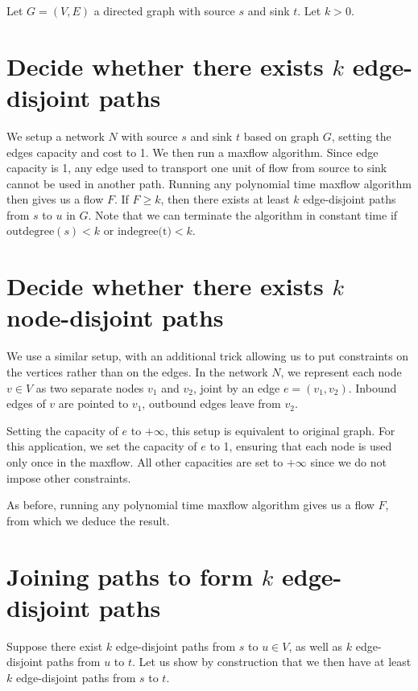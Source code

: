 \providecommand{\ra}[0]{\ensuremath{\rightarrow}}

Let $G = (V, E)$ a directed graph with source $s$ and sink $t$. Let $k > 0$.

\section{Decide whether there exists $k$ \textbf{edge}-disjoint paths}
We setup a network $N$ with source $s$ and sink $t$ based on graph $G$, setting the edges capacity and cost to 1. We then run a maxflow algorithm. Since edge capacity is 1, any edge used to transport one unit of flow from source to sink cannot be used in another path. Running any polynomial time maxflow algorithm then gives us a flow $F$. If $F \geq k$, then there exists at least $k$ edge-disjoint paths from $s$ to $u$ in $G$. Note that we can terminate the algorithm in constant time if $\text{outdegree}(s) < k$ or $\text{indegree(t)} < k$.

\section{Decide whether there exists $k$ \textbf{node}-disjoint paths}
We use a similar setup, with an additional trick allowing us to put constraints on the vertices rather than on the edges. In the network $N$, we represent each node $v \in V$ as two separate nodes $v_1$ and $v_2$, joint by an edge $e = (v_1, v_2)$. Inbound edges of $v$ are pointed to $v_1$, outbound edges leave from $v_2$.

Setting the capacity of $e$ to $+\infty$, this setup is equivalent to original graph. For this application, we set the capacity of $e$ to 1, ensuring that each node is used only once in the maxflow. All other capacities are set to $+\infty$ since we do not impose other constraints.

As before, running any polynomial time maxflow algorithm gives us a flow $F$, from which we deduce the result.

\section{Joining paths to form $k$ \textbf{edge}-disjoint paths}
Suppose there exist $k$ edge-disjoint paths from $s$ to $u \in V$, as well as $k$ edge-disjoint paths from $u$ to $t$. Let us show by construction that we then have at least $k$ edge-disjoint paths from $s$ to $t$.

